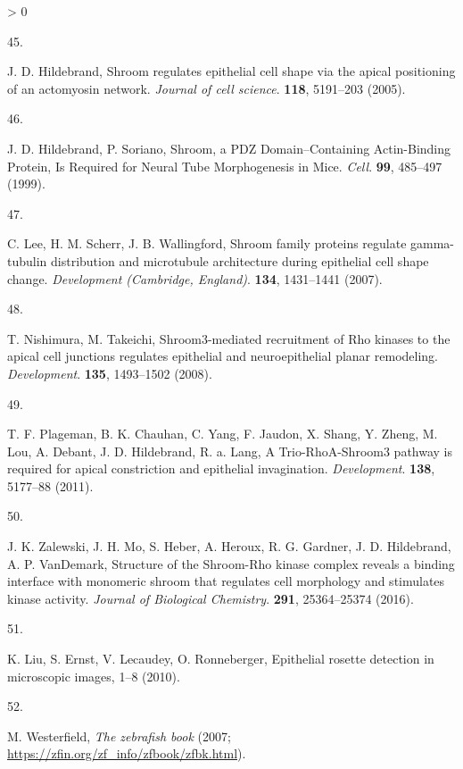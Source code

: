 \documentclass[10pt, b5paper, singlespacinge, twoside]{reedthesis} %
\newlength{\cslhangindent}
\newlength{\csllabelwidth}
\newenvironment{CSLReferences}[3] %
  {%
    \setlength{\parindent}{0pt}
    \ifodd #1 \everypar{\setlength{\hangindent}{\cslhangindent}}\ignorespaces\fi
    \ifnum #2 > 0
    \setlength{\parskip}{#2\baselineskip}
    \fi
  }%
  {}
\newcommand{\CSLLeftMargin}[1]{\parbox[t]{\maxof{\widthof{#1}}{\csllabelwidth}}{#1}}
\newcommand{\CSLRightInline}[1]{\parbox[t]{\linewidth}{#1}}
\theoremstyle{definition}
\theoremstyle{definition}
\theoremstyle{definition}
\theoremstyle{remark}
\begin{document}
\begin{CSLReferences}{0}{0}
\leavevmode\hypertarget{ref-Hildebrand2005}{}%
\CSLLeftMargin{45. }
\CSLRightInline{J. D. Hildebrand, {Shroom regulates epithelial cell shape via the apical positioning of an actomyosin network.} \emph{Journal of cell science}. \textbf{118}, 5191--203 (2005).}

\leavevmode\hypertarget{ref-Hildebrand1999a}{}%
\CSLLeftMargin{46. }
\CSLRightInline{J. D. Hildebrand, P. Soriano, {Shroom, a PDZ Domain--Containing Actin-Binding Protein, Is Required for Neural Tube Morphogenesis in Mice}. \emph{Cell}. \textbf{99}, 485--497 (1999).}

\leavevmode\hypertarget{ref-Lee2007}{}%
\CSLLeftMargin{47. }
\CSLRightInline{C. Lee, H. M. Scherr, J. B. Wallingford, {Shroom family proteins regulate gamma-tubulin distribution and microtubule architecture during epithelial cell shape change.} \emph{Development (Cambridge, England)}. \textbf{134}, 1431--1441 (2007).}

\leavevmode\hypertarget{ref-Nishimura2008}{}%
\CSLLeftMargin{48. }
\CSLRightInline{T. Nishimura, M. Takeichi, {Shroom3-mediated recruitment of Rho kinases to the apical cell junctions regulates epithelial and neuroepithelial planar remodeling}. \emph{Development}. \textbf{135}, 1493--1502 (2008).}

\leavevmode\hypertarget{ref-Plageman2011}{}%
\CSLLeftMargin{49. }
\CSLRightInline{T. F. Plageman, B. K. Chauhan, C. Yang, F. Jaudon, X. Shang, Y. Zheng, M. Lou, A. Debant, J. D. Hildebrand, R. a. Lang, {A Trio-RhoA-Shroom3 pathway is required for apical constriction and epithelial invagination.} \emph{Development}. \textbf{138}, 5177--88 (2011).}

\leavevmode\hypertarget{ref-Zalewski2016}{}%
\CSLLeftMargin{50. }
\CSLRightInline{J. K. Zalewski, J. H. Mo, S. Heber, A. Heroux, R. G. Gardner, J. D. Hildebrand, A. P. VanDemark, {Structure of the Shroom-Rho kinase complex reveals a binding interface with monomeric shroom that regulates cell morphology and stimulates kinase activity}. \emph{Journal of Biological Chemistry}. \textbf{291}, 25364--25374 (2016).}

\leavevmode\hypertarget{ref-Liu}{}%
\CSLLeftMargin{51. }
\CSLRightInline{K. Liu, S. Ernst, V. Lecaudey, O. Ronneberger, {Epithelial rosette detection in microscopic images}, 1--8 (2010).}

\leavevmode\hypertarget{ref-Westerfield2007}{}%
\CSLLeftMargin{52. }
\CSLRightInline{M. Westerfield, \emph{{The zebrafish book}} (2007; \url{https://zfin.org/zf_info/zfbook/zfbk.html}).}


\end{CSLReferences}
\end{document}
